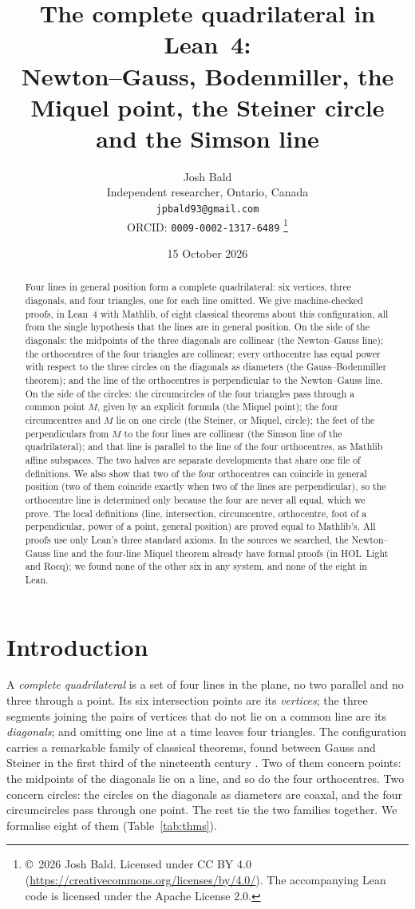 \documentclass[11pt]{article}
\title{The complete quadrilateral in Lean~4:\\
Newton--Gauss, Bodenmiller, the Miquel point, the Steiner circle and the Simson line}
\author{Josh Bald\\ \small Independent researcher, Ontario, Canada\\ \small\texttt{jpbald93@gmail.com}\\
\small ORCID: \texttt{0009-0002-1317-6489}
\thanks{\copyright~2026 Josh Bald. Licensed under CC BY 4.0 (\url{https://creativecommons.org/licenses/by/4.0/}). The accompanying Lean code is licensed under the Apache License 2.0.}}
\date{15 October 2026}
\theoremstyle{definition}
\theoremstyle{remark}
\begin{document}
\sloppy
\maketitle

\begin{abstract}
Four lines in general position form a complete quadrilateral: six vertices, three diagonals, and
four triangles, one for each line omitted. We give machine-checked proofs, in Lean~4 with Mathlib,
of eight classical theorems about this configuration, all from the single hypothesis that the lines
are in general position. On the side of the diagonals: the midpoints of the three diagonals are
collinear (the Newton--Gauss line); the orthocentres of the four triangles are collinear; every
orthocentre has equal power with respect to the three circles on the diagonals as diameters (the
Gauss--Bodenmiller theorem); and the line of the orthocentres is perpendicular to the Newton--Gauss
line. On the side of the circles: the circumcircles of the four triangles pass through a common point
$M$, given by an explicit formula (the Miquel point); the four circumcentres and $M$ lie on one circle
(the Steiner, or Miquel, circle); the feet of the perpendiculars from $M$ to the four lines are
collinear (the Simson line of the quadrilateral); and that line is parallel to the line of the four
orthocentres, as Mathlib affine subspaces. The two halves are separate developments that share one file of definitions. We also
show that two of the four orthocentres can coincide in general position (two of them coincide exactly
when two of the lines are perpendicular), so the orthocentre line is determined only because the four
are never all equal, which we prove. The local definitions (line, intersection, circumcentre,
orthocentre, foot of a perpendicular, power of a point, general position) are proved equal to
Mathlib's. All proofs use only Lean's
three standard axioms. In the sources we searched, the Newton--Gauss line and the four-line Miquel
theorem already have formal proofs (in HOL~Light and Rocq); we found none of the other six in any
system, and none of the eight in Lean.
\end{abstract}

\section{Introduction}

A \emph{complete quadrilateral} is a set of four lines in the plane, no two parallel and no three
through a point. Its six intersection points are its \emph{vertices}; the three segments joining the
pairs of vertices that do not lie on a common line are its \emph{diagonals}; and omitting one line at a
time leaves four triangles. The configuration carries a remarkable family of classical theorems,
found between Gauss and Steiner in the first third of the nineteenth century
\cite{steiner1828,coolidge1916,johnson1929}. Two of them concern points: the midpoints of the diagonals
lie on a line, and so do the four orthocentres. Two concern circles: the circles on the diagonals as
diameters are coaxal, and the four circumcircles pass through one point. The rest tie the two
families together. We formalise eight of them (Table~\ref{tab:thms}).
\end{document}
